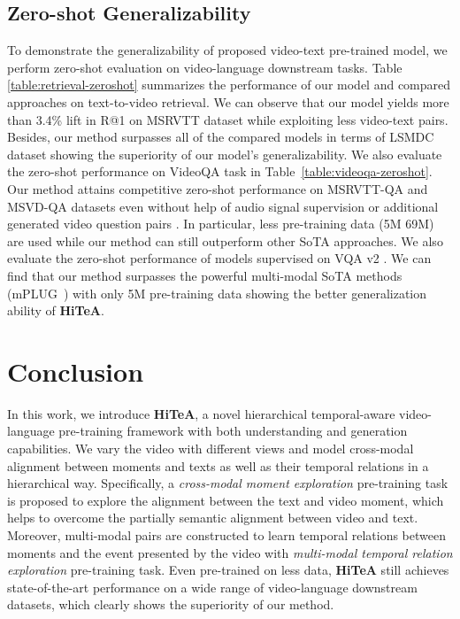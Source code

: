 \documentclass[10pt,twocolumn,letterpaper]{article}
\newcommand{\modelname}{\textbf{HiTeA}\xspace}
\begin{document}
\vspace{-1ex}
\subsection{Zero-shot Generalizability}
\vspace{-1ex}
To demonstrate the generalizability of proposed video-text pre-trained model, we perform zero-shot evaluation on video-language downstream tasks. Table \ref{table:retrieval-zeroshot} summarizes the performance of our model and compared approaches on text-to-video retrieval. We can observe that our model yields more than 3.4\% lift in R@1 on MSRVTT dataset \cite{xu2016msrvtt} while exploiting less video-text pairs. Besides, our method surpasses all of the compared models in terms of LSMDC dataset showing the superiority of our model's generalizability. We also evaluate the zero-shot performance on VideoQA task in Table~\ref{table:videoqa-zeroshot}. Our method attains competitive zero-shot performance on MSRVTT-QA and MSVD-QA datasets even without help of audio signal supervision \cite{zellers2022merlotreserve} or additional generated video question pairs \cite{yang2021justask}. In particular, less pre-training data (\ie 5M  69M) are used while our method can still outperform other SoTA approaches. We also evaluate the zero-shot performance of models supervised on VQA v2 \cite{goyal2017vqa}. We can find that our method surpasses the powerful multi-modal SoTA methods (\eg mPLUG~\cite{li2022mplug}) with only 5M pre-training data showing the better generalization ability of \modelname.


\section{Conclusion}
In this work, we introduce \modelname, a novel hierarchical temporal-aware video-language pre-training framework with both understanding and generation capabilities. We vary the video with different views and model cross-modal alignment between moments and texts as well as their temporal relations in a hierarchical way.
Specifically, a \textit{cross-modal moment exploration} pre-training task is proposed to explore the alignment between the text and video moment, which helps to overcome the partially semantic alignment between video and text. Moreover, multi-modal pairs are constructed to learn temporal relations between moments and the event presented by the video with \textit{multi-modal temporal relation exploration} pre-training task. Even pre-trained on less data, \modelname still achieves state-of-the-art performance on a wide range of video-language downstream datasets, which clearly shows the superiority of our method.
\end{document}
